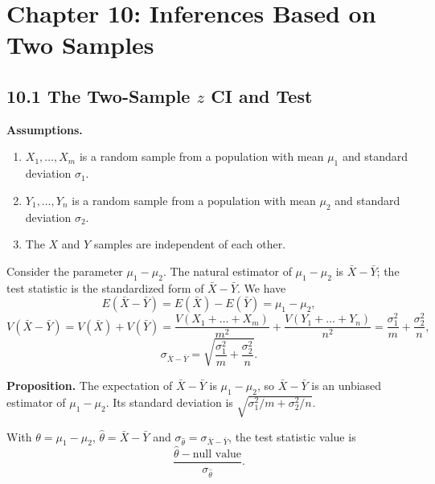 \section*{Chapter 10: Inferences Based on Two Samples}

\subsection*{10.1 The Two-Sample $z$ CI and Test}

\textbf{Assumptions.}
\begin{enumerate}
  \item $X_1,\dots,X_m$ is a random sample from a population with mean $\mu_1$ and standard deviation $\sigma_1$.
  \item $Y_1,\dots,Y_n$ is a random sample from a population with mean $\mu_2$ and standard deviation $\sigma_2$.
  \item The $X$ and $Y$ samples are independent of each other.
\end{enumerate}

Consider the parameter $\mu_1-\mu_2$. The natural estimator of $\mu_1-\mu_2$ is $\bar{X}-\bar{Y}$;
the test statistic is the standardized form of $\bar{X}-\bar{Y}$. We have
\[
E(\bar{X}-\bar{Y}) = E(\bar{X})-E(\bar{Y}) = \mu_1-\mu_2,
\]
\[
V(\bar{X}-\bar{Y}) = V(\bar{X})+V(\bar{Y}) = \frac{V(X_1+\dots+X_m)}{m^2} + \frac{V(Y_1+\dots+Y_n)}{n^2} = \frac{\sigma_1^2}{m}+\frac{\sigma_2^2}{n},
\]
\[
\sigma_{\bar{X}-\bar{Y}} = \sqrt{\frac{\sigma_1^2}{m}+\frac{\sigma_2^2}{n}}.
\]

\textbf{Proposition.} The expectation of $\bar{X}-\bar{Y}$ is $\mu_1-\mu_2$, so $\bar{X}-\bar{Y}$ is an unbiased estimator of $\mu_1-\mu_2$. Its standard deviation is
$\sqrt{\sigma_1^2/m+\sigma_2^2/n}$.

With $\theta=\mu_1-\mu_2$, $\hat\theta=\bar{X}-\bar{Y}$ and $\sigma_{\hat\theta}=\sigma_{\bar{X}-\bar{Y}}$, the test statistic value is
\[
\frac{\hat\theta - \text{null value}}{\sigma_{\hat\theta}} .
\]

